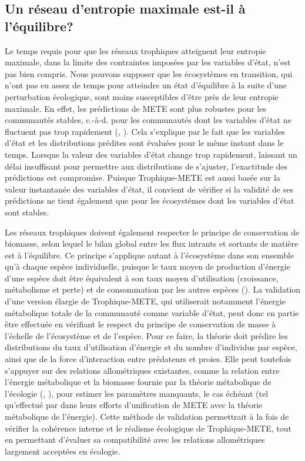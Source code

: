 \subsection{Un réseau d'entropie maximale est-il à l'équilibre?} 

Le temps requis pour que les réseaux trophiques atteignent leur entropie
maximale, dans la limite des contraintes imposées par les variables d'état,
n'est pas bien compris. Nous pouvons supposer que les écosystèmes en transition,
qui n'ont pas eu assez de temps pour atteindre un état d'équilibre à la suite
d'une perturbation écologique, sont moins susceptibles d'être près de leur
entropie maximale. En effet, les prédictions de METE sont plus robustes pour les
communautés stables, c.-à-d. pour les communautés dont les variables d'état ne
fluctuent pas trop rapidement (\cite{Newman2020Disturbance},
\cite{Harte2021Dynamete}). Cela s'explique par le fait que les variables d'état
et les distributions prédites sont évaluées pour le même instant dans le temps.
Lorsque la valeur des variables d'état change trop rapidement, laissant un délai
insuffisant pour permettre aux distributions de s'ajuster, l'exactitude des
prédictions est compromise. Puisque Trophique-METE est aussi basée sur la valeur
instantanée des variables d'état, il convient de vérifier si la validité de ses
prédictions ne tient également que pour les écosystèmes dont les variables
d'état sont stables.

Les réseaux trophiques doivent également respecter le principe de conservation
de biomasse, selon lequel le bilan global entre les flux intrants et sortants de
matière est à l'équilibre. Ce principe s'applique autant à l'écosystème dans son
ensemble qu'à chaque espèce individuelle, puisque le taux moyen de production
d'énergie d'une espèce doit être équivalent à son taux moyen d'utilisation
(croissance, métabolisme et perte) et de consommation par les autres espèces
(\cite{Sterner2002Ecological}). La validation d'une version élargie de
Trophique-METE, qui utiliserait notamment l'énergie métabolique totale de la
communauté comme variable d'état, peut donc en partie être effectuée en
vérifiant le respect du principe de conservation de masse à l'échelle de
l'écosystème et de l'espèce. Pour ce faire, la théorie doit prédire les
distributions du taux d'utilisation d'énergie et du nombre d'individus par
espèce, ainsi que de la force d'interaction entre prédateurs et proies. Elle
peut toutefois s'appuyer sur des relations allométriques existantes, comme la
relation entre l'énergie métabolique et la biomasse fournie par la théorie
métabolique de l'écologie (\cite{Brown2004Metabolic}, \cite{West1997General}),
pour estimer les paramètres manquants, le cas échéant (tel qu'effectué par
\cite{Harte2022Equation} dans leurs efforts d'unification de METE avec la
théorie métabolique de l'énergie). Cette méthode de validation permettrait à la
fois de vérifier la cohérence interne et le réalisme écologique de
Trophique-METE, tout en permettant d'évaluer sa compatibilité avec les relations
allométriques largement acceptées en écologie.


